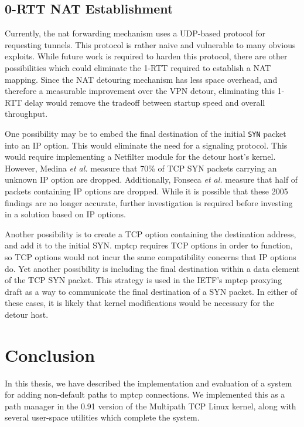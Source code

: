 \documentclass{cwru}
\begin{document}
\section{0-RTT NAT Establishment}
\label{sec:0rtt-nat}

Currently, the \ac{nat} forwarding mechanism uses a UDP-based protocol for
requesting tunnels. This protocol is rather naive and vulnerable to many obvious
exploits. While future work is required to harden this protocol, there are other
possibilities which could eliminate the 1-RTT required to establish a NAT
mapping. Since the NAT detouring mechanism has less space overhead, and
therefore a measurable improvement over the VPN detour, eliminating this 1-RTT
delay would remove the tradeoff between startup speed and overall throughput.

One possibility may be to embed the final destination of the initial
\texttt{SYN} packet into an IP option. This would eliminate the need for a
signaling protocol. This would require implementing a Netfilter module for the
detour host's kernel. However, Medina \textit{et al.} \cite{medina2005measuring}
measure that 70\% of TCP SYN packets carrying an unknown IP option are dropped.
Additionally, Fonseca \textit{et al.} \cite{fonseca2005ip} measure that half of
packets containing IP options are dropped. While it is possible that these 2005
findings are no longer accurate, further investigation is required before
investing in a solution based on IP options.

Another possibility is to create a TCP option containing the destination
address, and add it to the initial SYN. \ac{mptcp} requires TCP options in order
to function, so TCP options would not incur the same compatibility concerns that
IP options do. Yet another possibility is including the final destination within
a data element of the TCP SYN packet. This strategy is used in the IETF's
\ac{mptcp} proxying draft \cite{boucadair-mptcp-plain-mode-10} as a way to
communicate the final destination of a SYN packet. In either of these cases, it
is likely that kernel modifications would be necessary for the detour host.

\chapter{Conclusion}
\label{c:conclusion}

In this thesis, we have described the implementation and evaluation of a system
for adding non-default paths to \ac{mptcp} connections. We implemented this as a
path manager in the 0.91 version of the Multipath TCP Linux kernel, along with
several user-space utilities which complete the system.
\end{document}
